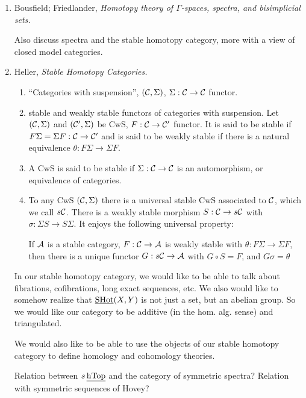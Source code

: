 \documentclass{article}%
\begin{document}
\begin{enumerate}
\item Bousfield; Friedlander, {\it Homotopy theory of $\Gamma$-spaces,
  spectra, and bisimplicial sets.}

Also discuss spectra and the stable homotopy category, more with a
view of closed model categories.

\item Heller, {\it Stable Homotopy Categories.}

\begin{enumerate}
\item ``Categories with suspension'', $(\mathcal{C}, \Sigma)$,
  $\Sigma:\mathcal{C}\rightarrow\mathcal{C}$ functor.
\item stable and weakly stable functors of categories with
  suspension. Let $(\mathcal{C},\Sigma)$ and $(\mathcal{C}',\Sigma)$ be CwS,
  $F:\mathcal{C}\rightarrow \mathcal{C}'$ functor. It is said to be stable if
  $F\Sigma = \Sigma F : \mathcal{C} \rightarrow \mathcal{C}'$ and is said to be
  weakly stable if there is a natural equivalence $\theta : F \Sigma
  \rightarrow \Sigma F$. 
\item A CwS is said to be stable if $\Sigma : \mathcal{C} \rightarrow \mathcal{C}$
  is an automorphism, or equivalence of categories.
\item To any CwS $(\mathcal{C},\Sigma)$ there is a universal stable CwS
  associated to $\mathcal{C}$, which we call $s\mathcal{C}$. There is a weakly
  stable morphism $S:\mathcal{C}\rightarrow s\mathcal{C}$ with $\sigma : \Sigma S
  \rightarrow S \Sigma$. It enjoys the following universal property:
  \begin{proposition}
    If $\mathcal{A}$ is a stable category, $F:\mathcal{C}\rightarrow \mathcal{A} $ is
    weakly stable with $\theta : F\Sigma \rightarrow \Sigma F$, then
    there is a unique functor $G: s\mathcal{C} \rightarrow \mathcal{A}$ with
    $G\circ S = F$, and $G\sigma = \theta$
  \end{proposition}
\end{enumerate}

In our stable homotopy category, we would like to be able to talk
about fibrations, cofibrations, long exact sequences, etc. We also
would like to somehow realize that $\operatorname{\underline{SHot}}(X,Y)$ is not just a set, but
an abelian group. So we would like our category to be additive (in the
hom. alg. sense) and triangulated.

We would also like to be able to use the objects of our stable
homotopy category to define homology and cohomology theories.

Relation between $s\operatorname{\underline{hTop}}$ and the category of symmetric spectra?
Relation with symmetric sequences of Hovey? 


\end{enumerate}
\end{document}
